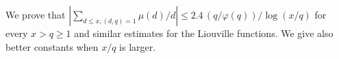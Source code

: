 \documentclass[12pt,a4paper,twoside]{article}
\begin{document}
  We prove that
  $|\sum_{d\le x,(d,q)=1}\mu(d)/d|\le 2.4\,(q/\varphi(q))/\log(x/q)$ for every $x>q\ge1$ and similar estimates for the Liouville
  functions. We give also better constants when $x/q$ is larger.
\end{document}

